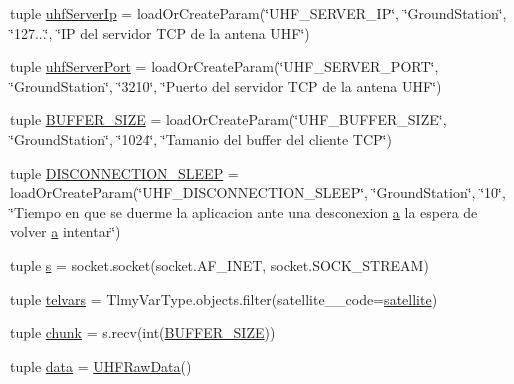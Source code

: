 \begin{DoxyCompactItemize}
\item 
tuple \hyperlink{namespace_tlmy_cmd_processor_1_1_tlmy_cmd_processor_ad1afaadb14f89dfd6adce55457a89fa4}{uhf\+Server\+Ip} = load\+Or\+Create\+Param(\char`\"{}U\+H\+F\+\_\+\+S\+E\+R\+V\+E\+R\+\_\+\+I\+P\char`\"{}, \char`\"{}Ground\+Station\char`\"{}, \char`\"{}127...\char`\"{}, \char`\"{}I\+P del servidor T\+C\+P de la antena U\+H\+F\char`\"{})
\item 
tuple \hyperlink{namespace_tlmy_cmd_processor_1_1_tlmy_cmd_processor_abc4f5193ae5293a175c24785f648c36f}{uhf\+Server\+Port} = load\+Or\+Create\+Param(\char`\"{}U\+H\+F\+\_\+\+S\+E\+R\+V\+E\+R\+\_\+\+P\+O\+R\+T\char`\"{}, \char`\"{}Ground\+Station\char`\"{}, \char`\"{}3210\char`\"{}, \char`\"{}Puerto del servidor T\+C\+P de la antena U\+H\+F\char`\"{})
\item 
tuple \hyperlink{namespace_tlmy_cmd_processor_1_1_tlmy_cmd_processor_ad6b870e079ada467cc4ac0b8f1f73039}{B\+U\+F\+F\+E\+R\+\_\+\+S\+I\+Z\+E} = load\+Or\+Create\+Param(\char`\"{}U\+H\+F\+\_\+\+B\+U\+F\+F\+E\+R\+\_\+\+S\+I\+Z\+E\char`\"{}, \char`\"{}Ground\+Station\char`\"{}, \char`\"{}1024\char`\"{}, \char`\"{}Tamanio del buffer del cliente T\+C\+P\char`\"{})
\item 
tuple \hyperlink{namespace_tlmy_cmd_processor_1_1_tlmy_cmd_processor_a053a883aeff5a224089cd5c791e2bc4c}{D\+I\+S\+C\+O\+N\+N\+E\+C\+T\+I\+O\+N\+\_\+\+S\+L\+E\+E\+P} = load\+Or\+Create\+Param(\char`\"{}U\+H\+F\+\_\+\+D\+I\+S\+C\+O\+N\+N\+E\+C\+T\+I\+O\+N\+\_\+\+S\+L\+E\+E\+P\char`\"{}, \char`\"{}Ground\+Station\char`\"{}, \char`\"{}10\char`\"{}, \char`\"{}Tiempo en que se duerme la aplicacion ante una desconexion \hyperlink{bootstrap_8min_8js_a9252b696bd8018d152e6640fcbe6e3b8}{a} la espera de volver \hyperlink{bootstrap_8min_8js_a9252b696bd8018d152e6640fcbe6e3b8}{a} intentar\char`\"{})
\item 
tuple \hyperlink{namespace_tlmy_cmd_processor_1_1_tlmy_cmd_processor_a5b740cec8cab496e71b6896c16dfba9d}{s} = socket.\+socket(socket.\+A\+F\+\_\+\+I\+N\+E\+T, socket.\+S\+O\+C\+K\+\_\+\+S\+T\+R\+E\+A\+M)
\item 
tuple \hyperlink{namespace_tlmy_cmd_processor_1_1_tlmy_cmd_processor_a9d8c45d2e203eaa7eb7be5ece0116d39}{telvars} = Tlmy\+Var\+Type.\+objects.\+filter(satellite\+\_\+\+\_\+code=\hyperlink{namespace_tlmy_cmd_processor_1_1_tlmy_cmd_processor_a5cf95a9cff868554c46d7a901df74673}{satellite})
\item 
tuple \hyperlink{namespace_tlmy_cmd_processor_1_1_tlmy_cmd_processor_a1ed237493e0f74a1a922ee4b54ef0657}{chunk} = s.\+recv(int(\hyperlink{namespace_tlmy_cmd_processor_1_1_tlmy_cmd_processor_ad6b870e079ada467cc4ac0b8f1f73039}{B\+U\+F\+F\+E\+R\+\_\+\+S\+I\+Z\+E}))
\item 
tuple \hyperlink{namespace_tlmy_cmd_processor_1_1_tlmy_cmd_processor_aa2dfd09891072d77d04b841a8bed1462}{data} = \hyperlink{class_ground_segment_1_1models_1_1_u_h_f_raw_data_1_1_u_h_f_raw_data}{U\+H\+F\+Raw\+Data}()
\end{DoxyCompactItemize}


